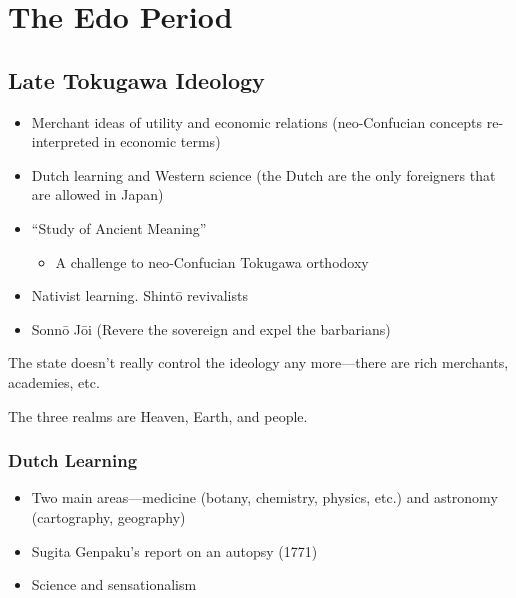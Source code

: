 \documentclass[class=article, crop=false]{standalone}
\begin{document}
  \section{The Edo Period}
  \subsection{Late Tokugawa Ideology}
  \begin{itemize}
    \item Merchant ideas of utility and economic relations (neo-Confucian concepts re-interpreted in economic terms)
    \item Dutch learning and Western science (the Dutch are the only foreigners that are allowed in Japan)
    \item ``Study of Ancient Meaning''
    \begin{itemize}
      \item A challenge to neo-Confucian Tokugawa orthodoxy
    \end{itemize}
    \item Nativist learning. Shint\=o revivalists
    \item Sonn\=o J\=oi (Revere the sovereign and expel the barbarians)
  \end{itemize}
  \begin{note}{}
    The state doesn't really control the ideology any more---there are rich merchants, academies, etc.
  \end{note}
  The three realms are Heaven, Earth, and people.
  \subsubsection{Dutch Learning}
  \begin{itemize}
    \item Two main areas---medicine (botany, chemistry, physics, etc.) and astronomy (cartography, geography)
    \item Sugita Genpaku's report on an autopsy (1771)
    \item Science and sensationalism
  \end{itemize}
\end{document}
